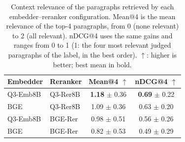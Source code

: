 \begin{table}[t]
\centering
\small
\caption{Context relevance of the paragraphs retrieved by each embedder--reranker configuration. Mean@4 is the mean relevance of the top-4 paragraphs, from 0 (none relevant) to 2 (all relevant). nDCG@4 uses the same gains and ranges from 0 to 1 (1: the four most relevant judged paragraphs of the label, in the best order). $\uparrow$: higher is better; best mean in bold.}
\label{tab:context-relevance}
\begin{tabular}{llcc}
\toprule
\textbf{Embedder} & \textbf{Reranker} & \textbf{Mean@4} $\uparrow$ & \textbf{nDCG@4} $\uparrow$ \\
\midrule
Q3-Emb8B & Q3-Rer8B & \textbf{1.18} $\pm$ 0.36 & \textbf{0.69} $\pm$ 0.22 \\
BGE & Q3-Rer8B & 1.09 $\pm$ 0.36 & 0.63 $\pm$ 0.20 \\
Q3-Emb8B & BGE-Rer & 0.98 $\pm$ 0.51 & 0.56 $\pm$ 0.26 \\
BGE & BGE-Rer & 0.82 $\pm$ 0.53 & 0.49 $\pm$ 0.29 \\
\bottomrule
\end{tabular}
\end{table}
